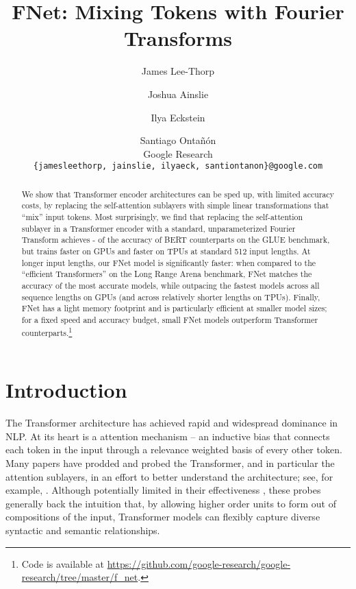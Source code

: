 \documentclass[11pt]{article}
\title{FNet: Mixing Tokens with Fourier Transforms}
\author{
  James Lee-Thorp \and Joshua Ainslie \and Ilya Eckstein \and Santiago Onta\~{n}\'{o}n \\
  Google Research \\
  \texttt{\{jamesleethorp, jainslie, ilyaeck, santiontanon\}@google.com}
}
\begin{document}
\maketitle

\begin{abstract}
  We show that Transformer encoder architectures can be sped up, with limited accuracy costs, by replacing the self-attention sublayers with simple linear transformations that ``mix'' input tokens. Most surprisingly, we find that replacing the self-attention sublayer in a Transformer encoder with a standard, unparameterized Fourier Transform achieves - of the accuracy of BERT counterparts on the GLUE benchmark, but trains  faster on GPUs and  faster on TPUs at standard 512 input lengths. At longer input lengths, our FNet model is significantly faster:  when compared to the ``efficient Transformers'' on the Long Range Arena benchmark, FNet matches the accuracy of the most accurate models, while outpacing the fastest models across all sequence lengths on GPUs (and across relatively shorter lengths on TPUs). Finally, FNet has a light memory footprint and is particularly efficient at smaller model sizes; for a fixed speed and accuracy budget, small FNet models outperform Transformer counterparts.\footnote{Code is available at \url{https://github.com/google-research/google-research/tree/master/f_net}.}
\end{abstract}


\section{Introduction}
\label{sec:introduction}

The Transformer architecture \citep{vaswani2017attention} has achieved rapid and widespread dominance in NLP. At its heart is a attention mechanism -- an inductive bias that connects each token in the input through a relevance weighted basis of every other token. Many papers have prodded and probed the Transformer, and in particular the attention sublayers, in an effort to better understand the architecture; see, for example, \citet{tenney-etal-2019-bert, vig-belinkov-2019-analyzing, clark-etal-2019-bert, voita-etal-2019-analyzing}. Although potentially limited in their effectiveness \citep{hewitt-liang-2019-designing}, these probes generally back the intuition that, by allowing higher order units to form out of compositions of the input, Transformer models can flexibly capture diverse syntactic and semantic relationships. 
\end{document}
